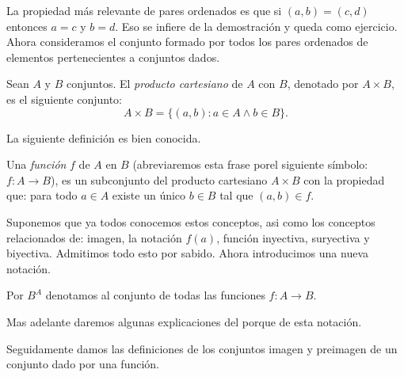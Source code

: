 La propiedad más relevante de pares ordenados es que si 
$(a,b)=(c,d)$ entonces $a=c$ y $b=d$. Eso se infiere de la demostración y queda como ejercicio. Ahora consideramos el
conjunto formado por todos los pares ordenados de elementos
pertenecientes a conjuntos dados.

\begin{definicion} Sean $A$ y $B$ conjuntos. El \emph{producto cartesiano} de $A$ con
$B$, denotado por $A\times B$, es el siguiente conjunto:
\[A\times B=\{(a,b):a\in A\wedge b\in B\}.\]
\end{definicion}
La siguiente definición es bien conocida.

\begin{definicion} Una  \emph{función} $f$ de $A$ en $B$ (abreviaremos esta frase
porel siguiente símbolo: $f:A\longrightarrow B$), es un
subconjunto del producto cartesiano $A\times B$ con la propiedad
que: para todo $a\in A$ existe un único $b\in B$ tal que
$(a,b)\in f$. \end{definicion}

Suponemos que ya todos conocemos estos conceptos, asi como los
conceptos relacionados de: imagen, la notación $f(a)$, función
inyectiva, suryectiva y biyectiva. Admitimos todo esto por sabido.
Ahora introducimos una nueva notación.

\begin{definicion}
Por $B^A$  denotamos al conjunto de todas las funciones
$f:A\longrightarrow B$.
\end{definicion}

Mas adelante daremos algunas explicaciones del porque de esta
notación.

Seguidamente damos las definiciones de los conjuntos imagen y preimagen de un conjunto dado por una función.


